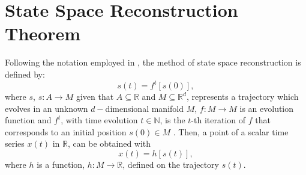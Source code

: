 \section{State Space Reconstruction Theorem}
Following the notation employed in \cite{casdagli1991, garland2016, gibson1992,
uzal2011, uzal2010, takens1981}, the method of state space reconstruction is defined by:
\begin{equation}\label{eq:ssr}
  s(t)=f^t [s(0)],
\end{equation}
where $s$, $s: A \rightarrow M$ given that $A \subseteq \mathbb{R}$ and $M \subseteq \mathbb{R}^d$,
represents a trajectory which evolves in an unknown $d-$dimensional manifold $M$,
$f: M \rightarrow M$ is an evolution function and $f^t$, with time evolution $t \in \mathbb{N}$,
is the $t$-th iteration of $f$ that corresponds to an initial position $s(0) \in M $ \cite{takens1981}.
Then, a point of a scalar time series $x(t)$ in $\mathbb{R}$, can be obtained with
\begin{equation}\label{eq:measurement}
  x(t)=h[s(t)],
\end{equation}
where $h$ is a function, $h: M \rightarrow \mathbb{R}$, defined on the trajectory $s(t)$.

